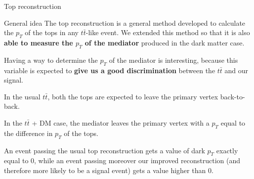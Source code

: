 \documentclass[handout,8 pt]{beamer}
\begin{document}
\begin{frame}{Top reconstruction}

	\begin{block}{\vspace{5pt} General idea}
	\justifying
	\vspace{5pt}
	The top reconstruction is a general method developed to calculate the $p_T$ of the tops in any $t \bar t$-like event. We extended this method so that it is also \textbf{able to measure the $p_T$ of the mediator} produced in the dark matter case.\\ \vspace{8pt}
	\end{block} \vfill
	
	\justifying
	Having a way to determine the $p_T$ of the mediator is interesting, because this variable is expected to \textbf{give us a good discrimination} between the $t \bar t$ and our signal. \vfill
	
   \begin{minipage}[c]{.24\linewidth}
   \end{minipage} \hfill
   \begin{minipage}[c]{.24\linewidth}
   	\justifying
	In the usual $t \bar t$, both the tops are expected to leave the primary vertex back-to-back.
   \end{minipage} \hfill
   \begin{minipage}[c]{.24\linewidth}
   \end{minipage} \hfill
   \begin{minipage}[c]{.24\linewidth}
   	\justifying
	In the $t \bar t$ + DM case, the mediator leaves the primary vertex with a $p_T$ equal to the difference in $p_T$ of the tops.
   \end{minipage} \hfill \vfill

	\justifying
	An event passing the usual top reconstruction gets a value of dark $p_T$ exactly equal to 0, while an event passing moreover our improved reconstruction (and therefore more likely to be a signal event) gets a value higher than 0. \vfill

\end{frame}
\end{document}
